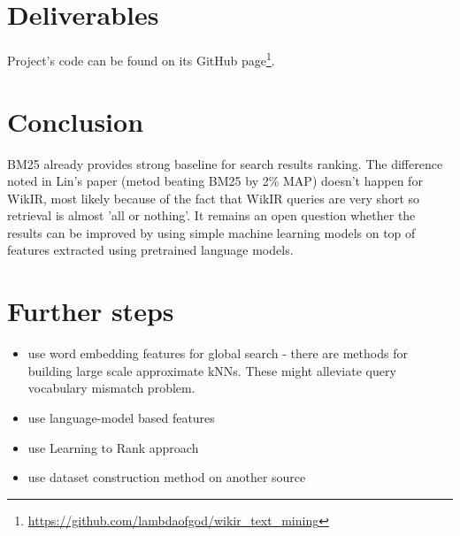 \documentclass{article}
\begin{document}
\section{Deliverables}

Project's code can be found on its GitHub page\footnote{\href{https://github.com/lambdaofgod/wikir_text_mining}{https://github.com/lambdaofgod/wikir_text_mining}}.

\section{Conclusion}
BM25 already provides strong baseline for search results ranking. The difference noted in Lin's paper (metod beating BM25 by 2\% MAP) doesn't happen for WikIR, most likely because of the fact that WikIR queries are very short so retrieval is almost 'all or nothing'. It remains an open question whether the results can be improved by using simple machine learning models on top of features extracted using pretrained language models.

\section{Further steps}
\begin{itemize}
    \item use word embedding features for global search - there are methods for building large scale approximate kNNs. These might alleviate query vocabulary mismatch problem.
    \item use language-model based features
    \item use Learning to Rank approach
    \item use dataset construction method on another source
\end{itemize}



\end{document}
